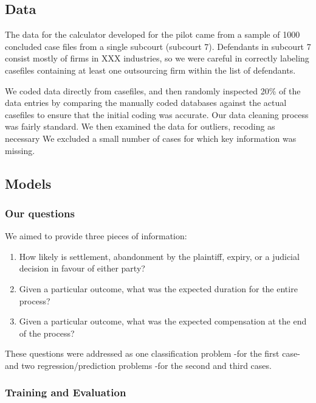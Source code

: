 \documentclass[]{article}
\begin{document}
\subsection{Data}\label{data}

The data for the calculator developed for the pilot came from a sample
of 1000 concluded case files from a single subcourt (subcourt 7).
Defendants in subcourt 7 consist mostly of firms in XXX industries, so
we were careful in correctly labeling casefiles containing at least one
outsourcing firm within the list of defendants.

We coded data directly from casefiles, and then randomly inspected 20\%
of the data entries by comparing the manually coded databases against
the actual casefiles to ensure that the initial coding was accurate. Our
data cleaning process was fairly standard. We then examined the data for
outliers, recoding as necessary We excluded a small number of cases for
which key information was missing.

\subsection{Models}\label{models}

\subsubsection{Our questions}\label{our-questions}

We aimed to provide three pieces of information:

\begin{enumerate}
\def\labelenumi{\arabic{enumi}.}
\item
  How likely is settlement, abandonment by the plaintiff, expiry, or a
  judicial decision in favour of either party?
\item
  Given a particular outcome, what was the expected duration for the
  entire process?
\item
  Given a particular outcome, what was the expected compensation at the
  end of the process?
\end{enumerate}

These questions were addressed as one classification problem -for the
first case- and two regression/prediction problems -for the second and
third cases.

\subsubsection{Training and Evaluation}\label{training-and-evaluation}
\end{document}
